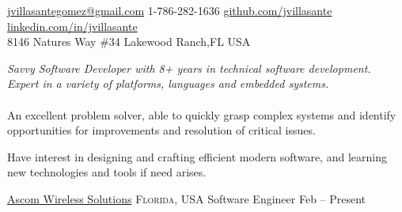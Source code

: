 \documentclass[10pt,a4paper]{article}
\begin{document}
\sloppy  %



\nobreakvspace{0.3em}  %

\noindent\href{mailto:jvillasantegomez.at.gmail.dot.com}{jvillasantegomez\mbox{}@\mbox{}gmail.com}\sbull
\textsmaller{+}1-786-282-1636\sbull
\href{https://github.com/jvillasante}{github.com/jvillasante}\sbull
\href{http://linkedin.com/in/jvillasante}{linkedin.com/in/jvillasante}
\\
8146 Natures Way {\sc \#34}\sbull
Lakewood Ranch,\thinspace FL\sbull
{\large {}}\sbull
USA

\spacedhrule{0.9em}{-0.4em}  %


\vspace{-1.3em}  %
\begin{multicols}{2}  %
\noindent \emph{Savvy Software Developer with 8+ years in technical software development. Expert in a variety of platforms, languages and embedded systems.}
\\
\\
An excellent problem solver, able to quickly grasp complex systems and identify opportunities for improvements and resolution of critical issues.

Have interest in designing and crafting efficient modern software, and learning new technologies and tools if need arises.
\end{multicols}

\spacedhrule{0em}{-0.4em}


\headedsection
  {\href{http://www.ascom.us/}{Ascom Wireless Solutions}}
  {\textsc{Florida, USA}} {%
  \headedsubsection
    {Software Engineer}
    {Feb  -- Present}
    {}
}
\end{document}
